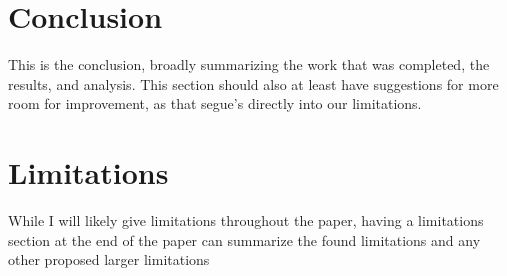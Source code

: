 \documentclass[runningheads]{llncs}
\begin{document}
\section{Conclusion}
This is the conclusion, broadly summarizing the work that was completed, the results, and analysis. This section should also at least have suggestions for more room for improvement, as that segue's directly into our limitations.

\section{Limitations}
While I will likely give limitations throughout the paper, having a limitations section at the end of the paper can summarize the found limitations and any other proposed larger limitations
\end{document}
